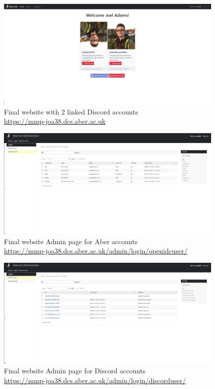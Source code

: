 \begin{figure}[H]
	\centering
	\includegraphics[width=1\linewidth]{Figures/website-acc-2.png}
	\caption{Final website with 2 linked Discord accounts \\\centering\href{https://mmp-joa38.dcs.aber.ac.uk}{https://mmp-joa38.dcs.aber.ac.uk}}
	\label{fig:final-web-acc-2}
\end{figure}

\begin{figure}[H]
	\centering
	\includegraphics[width=1\linewidth]{Figures/website-admin-openidc.png}
	\caption{Final website Admin page for Aber accounts \\\centering\href{https://mmp-joa38.dcs.aber.ac.uk/admin/login/openidcuser/}{https://mmp-joa38.dcs.aber.ac.uk/admin/login/openidcuser/}}
	\label{fig:final-web-admin-openidc}
\end{figure}

\begin{figure}[H]
	\centering
	\includegraphics[width=1\linewidth]{Figures/website-admin-discord.png}
	\caption{Final website Admin page for Discord accounts \\\centering\href{https://mmp-joa38.dcs.aber.ac.uk/admin/login/discorduser/}{https://mmp-joa38.dcs.aber.ac.uk/admin/login/discorduser/}}
	\label{fig:final-web-admin-dis}
\end{figure}

